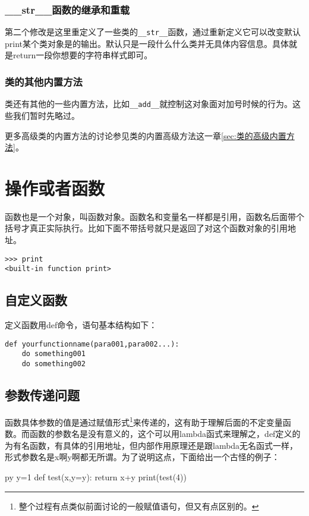 \documentclass[12pt,oneside]{book}
\begin{document}
\begin{common-format}
\subsection{\_\_str\_\_{}函数的继承和重载}
第二个修改是这里重定义了一些类的\verb+__str__+函数，通过重新定义它可以改变默认print某个类对象是的输出。默认只是一段什么什么类并无具体内容信息。具体就是return一段你想要的字符串样式即可。




\subsection{类的其他内置方法}
类还有其他的一些内置方法，比如\verb+__add__+就控制这对象面对加号时候的行为。这些我们暂时先略过。

更多高级类的内置方法的讨论参见类的内置高级方法这一章\ref{sec:类的高级内置方法}。




\chapter{操作或者函数}
函数也是一个对象，叫函数对象。函数名和变量名一样都是引用，函数名后面带个括号才真正实际执行。比如下面不带括号就只是返回了对这个函数对象的引用地址。
\begin{Verbatim}
>>> print
<built-in function print>
\end{Verbatim}



\section{自定义函数}
定义函数用def命令，语句基本结构如下：
\begin{Verbatim}
def yourfunctionname(para001,para002...):
    do something001
    do something002
\end{Verbatim}



\section{参数传递问题}
函数具体参数的值是通过赋值形式\footnote{整个过程有点类似前面讨论的一般赋值语句，但又有点区别的。}来传递的，这有助于理解后面的不定变量函数。而函数的参数名是没有意义的，这个可以用lambda函式来理解之，def定义的为有名函数，有具体的引用地址，但内部作用原理还是跟lambda无名函式一样，形式参数名是x啊y啊都无所谓。为了说明这点，下面给出一个古怪的例子：

\begin{xverbatim}[129]{py}
y=1
def test(x,y=y):
    return x+y
print(test(4))
\end{xverbatim}


\end{common-format}
\end{document}

